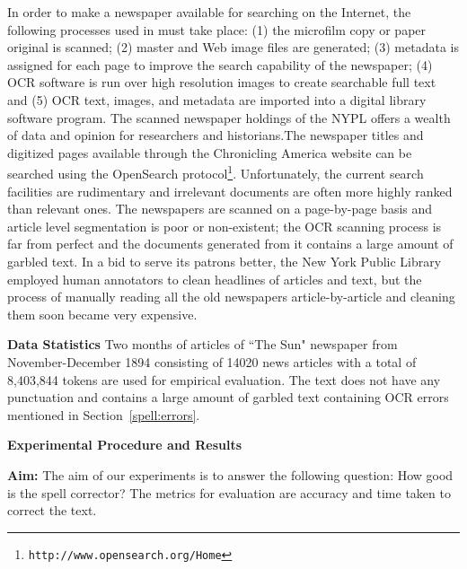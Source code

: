 \documentclass[preprint,11pt]{elsarticle}
\begin{document}
In order to make a newspaper available for searching on the Internet,
the following processes used in \cite{dutta2011learning} must take place: (1) the microfilm copy or
paper original is scanned; (2) master and Web image files are
generated; (3) metadata is assigned for each page to improve the
search capability of the newspaper; (4) OCR software is run over high
resolution images to create searchable full text and (5) OCR text,
images, and metadata are imported into a digital library software
program. 
The scanned newspaper holdings of the NYPL offers a wealth of
data and opinion for researchers and historians.The newspaper titles and digitized pages available through the
Chronicling America website can be searched using the OpenSearch
protocol\footnote{\texttt{http://www.opensearch.org/Home}}.
Unfortunately, the current search facilities are rudimentary and
irrelevant documents are often more highly ranked than relevant ones.
The newspapers are scanned on a page-by-page basis and article level
segmentation is poor or non-existent; the OCR scanning process is far
from perfect and the documents generated from it contains a large
amount of garbled text. In a bid to serve its patrons better, the New
York Public Library employed human annotators to clean headlines of
articles and text, but the process of manually reading all the old
newspapers article-by-article and cleaning them soon became very
expensive. 

\noindent \textbf{Data Statistics }%
Two months of articles of ``The Sun" newspaper from November-December 1894 consisting of 14020 news articles with a total of 8,403,844 tokens are used for empirical evaluation. %
The text does not have any punctuation and contains a large amount of garbled text containing OCR errors mentioned in Section~\ref{spell:errors}.

\noindent \textbf{Experimental Procedure and Results}

\noindent \textbf{Aim: }The aim of our experiments is to answer the following question:
How good is the spell corrector? The metrics for evaluation are accuracy and time taken to correct the text.
\end{document}

